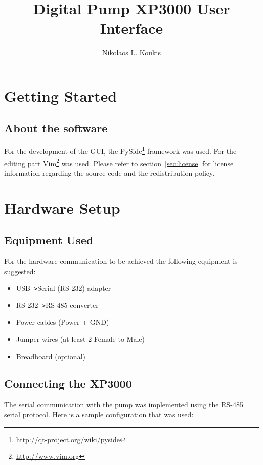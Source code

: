 \documentclass[a4paper]{article}
\title{Digital Pump XP3000 User Interface}
\author{Nikolaos L. Koukis}
\begin{document}
\maketitle
\tableofcontents
\listoffigures
\pagebreak
\section{Getting Started}

\subsection{About the software}
For the development of the GUI, the PySide\footnote{\url{http://qt-project.org/wiki/pyside}}
framework was used. For the editing part Vim\footnote{\url{http://www.vim.org}} was used.
Please refer to section~\ref{sec:license} for license information
regarding the source code and the redistribution policy.

\section{Hardware Setup}
\subsection{Equipment Used}
For the hardware communication to be achieved the following equipment is suggested:
\begin{itemize}
    \item USB\verb|->|Serial (RS-232) adapter
    \item RS-232\verb|->|RS-485 converter
    \item Power cables (Power + GND)
    \item Jumper wires (at least 2 Female to Male)
    \item Breadboard (optional)
\end{itemize}
\subsection{Connecting the XP3000}
The serial communication with the pump was implemented using the RS-485 serial
protocol. Here is a sample configuration that was used:
\end{document}
